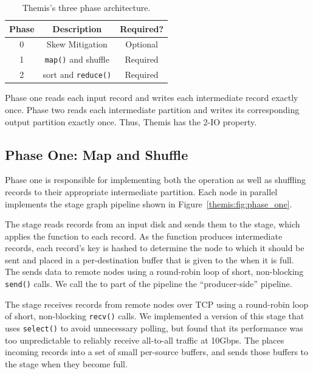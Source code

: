 \begin{table}
\centering
\caption{\label{tbl:stages} Themis's three phase architecture.}
\begin{tabular}{|c|c|c|} \hline
\textbf{Phase} & \textbf{Description} & \textbf{Required?} \\\hline
0 & Skew Mitigation & Optional \\
1 & \texttt{map()} and shuffle & Required \\
2 & sort and \texttt{reduce()} & Required \\\hline
\end{tabular}
\end{table}

Phase one reads each input record and writes each intermediate record exactly
once.  Phase two reads each intermediate partition and writes its corresponding
output partition exactly once.  Thus, Themis has the 2-IO property.

\subsection{Phase One: Map and Shuffle}
\label{sec:phase_one}
\label{sec:map}

Phase one is responsible for implementing both the \map operation as well as
shuffling records to their appropriate intermediate partition.  Each node in
parallel implements the stage graph pipeline shown in
Figure~\ref{themis:fig:phase_one}.

The \Readerbf stage reads records from an input disk and sends them to the
\Mapperbf stage, which applies the \map function to each record.  As the \map
function produces intermediate records, each record's key is hashed to
determine the node to which it should be sent and placed in a
per-destination buffer that is given to the \sender when it is full.  The
\Senderbf sends data to remote nodes using a round-robin loop of short,
non-blocking \texttt{send()} calls.  We call the \Reader to \Sender part of the
pipeline the ``producer-side'' pipeline.

The \Receiverbf stage receives records from remote nodes over TCP using
a round-robin loop of short, non-blocking \texttt{recv()} calls. We implemented
a version of this stage that uses \texttt{select()} to avoid unnecessary
polling, but found that its performance was too unpredictable to reliably
receive all-to-all traffic at 10Gbps. The \receiver places incoming records
into a set of small per-source buffers, and sends those buffers to
the \Demux stage when they become full.

